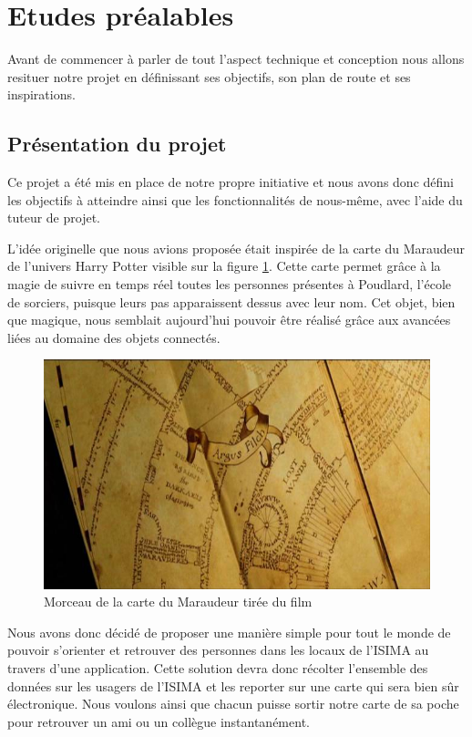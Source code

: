 \section{Etudes préalables}

Avant de commencer à parler de tout l’aspect technique et conception nous allons resituer notre projet en définissant ses objectifs, son plan de route et ses inspirations.

\subsection{Présentation du projet}

Ce projet a été mis en place de notre propre initiative et nous avons donc défini les objectifs à atteindre ainsi que les fonctionnalités de nous-même, avec l'aide du tuteur de projet.

L’idée originelle que nous avions proposée était inspirée de la carte du Maraudeur de l’univers Harry Potter visible sur la figure \ref{marauder}. Cette carte permet grâce à la magie de suivre en temps réel toutes les personnes présentes à Poudlard, l’école de sorciers, puisque leurs pas apparaissent dessus avec leur nom. Cet objet, bien que magique, nous semblait aujourd’hui pouvoir être réalisé grâce aux avancées liées au domaine des objets connectés. 

\begin{figure}[H]
    \centering
    \includegraphics{./img/marauder.jpg}
    \caption{Morceau de la carte du Maraudeur tirée du film}
    \label{marauder}
\end{figure}

Nous avons donc décidé de proposer une manière simple pour tout le monde de pouvoir s'orienter et retrouver des personnes dans les locaux de l'ISIMA au travers d’une application. Cette solution devra donc récolter l’ensemble des données sur les usagers de l’ISIMA et les reporter sur une carte qui sera bien sûr électronique. Nous voulons ainsi que chacun puisse sortir notre carte de sa poche pour retrouver un ami ou un collègue instantanément.

